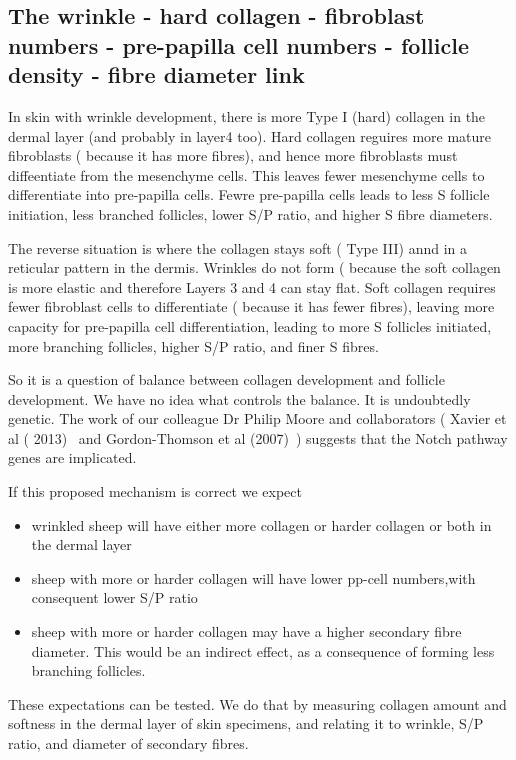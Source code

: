 \documentclass[titlepage]{article}  %
\begin{document}
\subsection{The wrinkle - hard collagen - fibroblast numbers - pre-papilla cell numbers - follicle density - fibre diameter link}
In skin with wrinkle development, there is more Type I (hard) collagen in the dermal layer (and probably in layer4 too). Hard collagen reguires more mature fibroblasts ( because it has more fibres), and hence more fibroblasts must diffeentiate from the mesenchyme cells. This leaves fewer mesenchyme cells to differentiate into pre-papilla cells. Fewre pre-papilla cells leads to less S follicle initiation, less branched follicles, lower S/P ratio, and higher S fibre diameters.

The reverse situation is where the collagen stays soft ( Type III) annd in a reticular pattern in the dermis. Wrinkles do not form ( because the soft collagen is more elastic and therefore Layers 3 and 4 can stay flat. Soft collagen requires fewer fibroblast cells to differentiate ( because it has fewer fibres), leaving more capacity for pre-papilla cell differentiation, leading to more S follicles initiated, more branching follicles, higher S/P ratio, and finer S fibres.

So it is a question of balance between collagen development and follicle development. We have no idea what controls the balance. It  is undoubtedly genetic. The work of our colleague Dr Philip Moore and collaborators ( Xavier et al ( 2013)~\cite{xavi:03} and Gordon-Thomson et al (2007)~\cite{gord:08}) suggests that the Notch pathway genes are implicated.

If this proposed mechanism is correct we expect
\begin{itemize}
\item wrinkled sheep will have either more collagen or harder collagen or both in the dermal layer
\item sheep with more or harder collagen will have lower pp-cell numbers,with consequent lower S/P ratio 
\item sheep with more or harder collagen may have a higher secondary fibre diameter. This would be an indirect effect, as a consequence of forming less branching follicles.
\end{itemize}
 
These expectations can be tested. We do that by measuring collagen amount and softness in the dermal layer of skin specimens, and relating it to wrinkle, S/P ratio, and diameter of secondary fibres.
\end{document}
